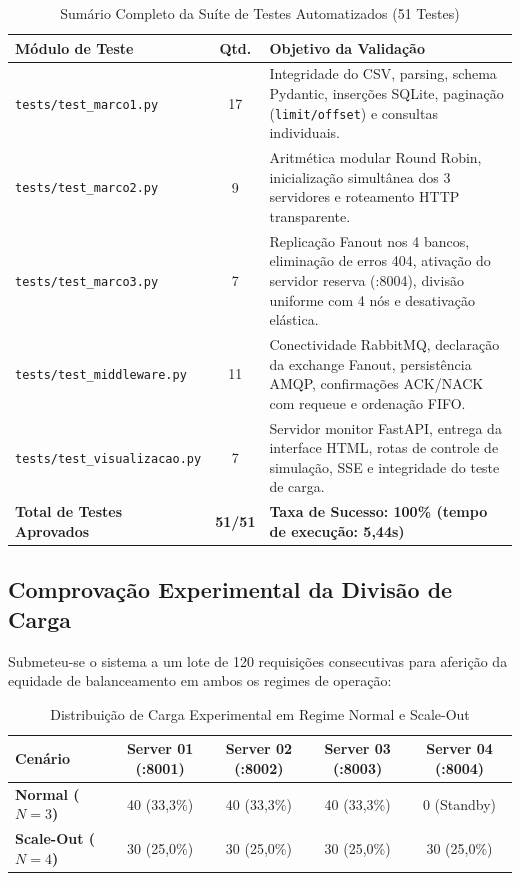 \documentclass[12pt,a4paper]{article}
\begin{document}
	\begin{table}[H]
		\centering
		\small
		\caption{Sumário Completo da Suíte de Testes Automatizados (51 Testes)}
		\label{tab:testes_marco3}
		\begin{tabularx}{\textwidth}{l c X}
			\toprule
			\textbf{Módulo de Teste} & \textbf{Qtd.} & \textbf{Objetivo da Validação} \\
			\midrule
			\texttt{tests/test\_marco1.py} & 17 & Integridade do CSV, parsing, schema Pydantic, inserções SQLite, paginação (\texttt{limit/offset}) e consultas individuais. \\
			\texttt{tests/test\_marco2.py} & 9 & Aritmética modular Round Robin, inicialização simultânea dos 3 servidores e roteamento HTTP transparente. \\
			\texttt{tests/test\_marco3.py} & 7 & Replicação Fanout nos 4 bancos, eliminação de erros 404, ativação do servidor reserva (:8004), divisão uniforme com 4 nós e desativação elástica. \\
			\texttt{tests/test\_middleware.py} & 11 & Conectividade RabbitMQ, declaração da exchange Fanout, persistência AMQP, confirmações ACK/NACK com requeue e ordenação FIFO. \\
			\texttt{tests/test\_visualizacao.py} & 7 & Servidor monitor FastAPI, entrega da interface HTML, rotas de controle de simulação, SSE e integridade do teste de carga. \\
			\midrule
			\textbf{Total de Testes Aprovados} & \textbf{51/51} & \textbf{Taxa de Sucesso: 100\% (tempo de execução: 5,44s)} \\
			\bottomrule
		\end{tabularx}
	\end{table}
	
	\subsection{Comprovação Experimental da Divisão de Carga}
	Submeteu-se o sistema a um lote de 120 requisições consecutivas para aferição da equidade de balanceamento em ambos os regimes de operação:
	
	\begin{table}[H]
		\centering
		\small
		\caption{Distribuição de Carga Experimental em Regime Normal e Scale-Out}
		\label{tab:distribuicao}
		\begin{tabularx}{\textwidth}{p{3.8cm} c c c c}
			\toprule
			\textbf{Cenário} & \textbf{Server 01 (:8001)} & \textbf{Server 02 (:8002)} & \textbf{Server 03 (:8003)} & \textbf{Server 04 (:8004)} \\
			\midrule
			\textbf{Normal ($N=3$)} & 40 (33,3\%) & 40 (33,3\%) & 40 (33,3\%) & 0 (Standby) \\
			\textbf{Scale-Out ($N=4$)} & 30 (25,0\%) & 30 (25,0\%) & 30 (25,0\%) & 30 (25,0\%) \\
			\bottomrule
		\end{tabularx}
	\end{table}
	
\end{document}
